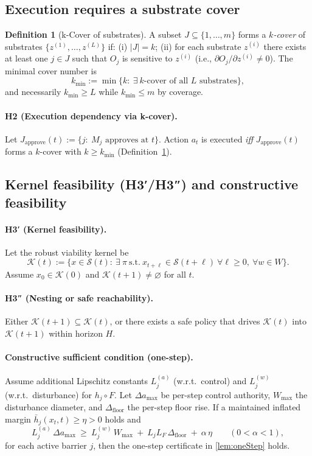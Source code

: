 \documentclass[11pt]{article}
\theoremstyle{definition}
\newtheorem{definition}[theorem]{Definition}
\newcommand{\K}{\mathcal{K}}
\newcommand{\Sset}{\mathcal{S}}
\begin{document}
\subsection{Execution requires a substrate cover}
\begin{definition}[k-Cover of substrates]\label{def:kcover}
A subset $J\subseteq\{1,\dots,m\}$ forms a \emph{$k$-cover} of substrates $\{z^{(1)},\dots,z^{(L)}\}$ if: (i) $|J|=k$; (ii) for each substrate $z^{(i)}$ there exists at least one $j\in J$ such that $O_j$ is sensitive to $z^{(i)}$ (i.e., $\partial O_j/\partial z^{(i)}\neq 0$). The minimal cover number is
\[
k_{\min}:=\min\{k:\ \exists\ \text{$k$-cover of all }L\text{ substrates}\},
\]
and necessarily $k_{\min}\ge L$ while $k_{\min}\le m$ by coverage.
\end{definition}

\paragraph{H2 (Execution dependency via k-cover).}
Let $J_{\mathrm{approve}}(t):=\{j:\ M_j \text{ approves at } t\}$. Action $a_t$ is executed \emph{iff} $J_{\mathrm{approve}}(t)$ forms a $k$-cover with $k\ge k_{\min}$ (Definition~\ref{def:kcover}).

\subsection{Kernel feasibility (H3′/H3″) and constructive feasibility}
\paragraph{H3′ (Kernel feasibility).}
Let the robust viability kernel be
\[
\K(t):=\{x\in \Sset(t):\ \exists\ \pi\ \text{s.t.}\ x_{t+\ell}\in \Sset(t+\ell)\ \forall \ell\ge 0,\ \forall w\in W\}.
\]
Assume $x_0\in \K(0)$ and $\K(t+1)\neq\varnothing$ for all $t$.

\paragraph{H3″ (Nesting or safe reachability).}
Either $\K(t+1)\subseteq \K(t)$, or there exists a safe policy that drives $\K(t)$ into $\K(t+1)$ within horizon $H$.

\paragraph{Constructive sufficient condition (one-step).}
Assume additional Lipschitz constants $L^{(a)}_j$ (w.r.t.\ control) and $L^{(w)}_j$ (w.r.t.\ disturbance) for $h_j\circ F$. Let $\Delta a_{\max}$ be per-step control authority, $W_{\max}$ the disturbance diameter, and $\Delta_{\mathrm{floor}}$ the per-step floor rise. If a maintained inflated margin $\bar h_j(x_t,t)\ge \eta>0$ holds and
\begin{equation}
\label{eq:star}
L^{(a)}_j\,\Delta a_{\max}\ \ge\ L^{(w)}_j\,W_{\max}\ +\ L_j L_F\,\Delta_{\mathrm{floor}}\ +\ \alpha\,\eta\qquad(0<\alpha<1),
\end{equation}
for each active barrier $j$, then the one-step certificate in \cref{lem:oneStep} holds.
\end{document}
